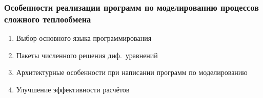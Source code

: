 \begin{frame}
    \frametitle{Особенности реализации программ по моделированию процессов сложного теплообмена}
    \begin{enumerate}
        \item Выбор основного языка программирования
        \item Пакеты численного решения диф.\ уравнений
        \item Архитектурные особенности при написании программ по моделированию
        \item Улучшение эффективности расчётов
    \end{enumerate}
\end{frame}
